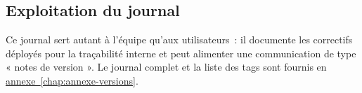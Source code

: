\subsection{Exploitation du journal}
Ce journal sert autant à l'équipe qu'aux utilisateurs~: il documente les correctifs déployés pour la traçabilité interne et peut alimenter une communication de type « notes de version ». Le journal complet et la liste des tags sont fournis en \hyperref[chap:annexe-versions]{annexe~\ref*{chap:annexe-versions}}.

